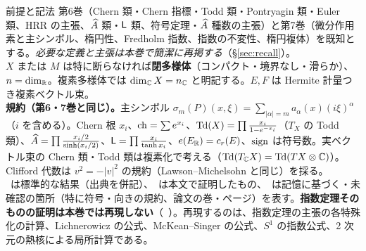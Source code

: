 \begin{goalbox}{前提と記法}
第6巻（Chern 類・Chern 指標・Todd 類・Pontryagin 類・Euler 類、HRR の主張、$\widehat{A}$ 類・$\mathsf{L}$ 類、符号定理・$\widehat{A}$ 種数の主張）と第7巻（微分作用素と主シンボル、楕円性、Fredholm 指数、指数の不変性、楕円複体）を既知とする。\emph{必要な定義と主張は本巻で簡潔に再掲する}（\S\ref{sec:recall}）。\\
$X$ または $M$ は特に断らなければ\textbf{閉多様体}（コンパクト・境界なし・滑らか）、$n=\dim_{\mathbb R}$。複素多様体では $\dim_{\mathbb C}X=n_{\mathbb C}$ と明記する。$E,F$ は Hermite 計量つき複素ベクトル束。\\
\textbf{規約（第6・7巻と同じ）。}主シンボル $\sigma_m(P)(x,\xi)=\sum_{|\alpha|=m}a_\alpha(x)(i\xi)^\alpha$（$i$ を含める）。Chern 根 $x_i$、$\mathrm{ch}=\sum e^{x_i}$、$\mathrm{Td}(X)=\prod\frac{x_i}{1-e^{-x_i}}$（$T_X$ の Todd 類）、$\widehat{A}=\prod\frac{x_i/2}{\sinh(x_i/2)}$、$\mathsf{L}=\prod\frac{x_i}{\tanh x_i}$、$e(E_{\mathbb R})=c_r(E)$、$\operatorname{sign}$ は符号数。実ベクトル束の Chern 類・Todd 類は複素化で考える（$\mathrm{Td}(T_{\mathbb C}X)=\mathrm{Td}(TX\otimes\mathbb C)$）。\\
Clifford 代数は $v^2=-|v|^2$ の規約（Lawson--Michelsohn と同じ）を採る。\\
\tC\ は標準的な結果（出典を併記）、\tP\ は本文で証明したもの、\tQ\ は記憶に基づく・未確認の箇所（特に符号・向きの規約、論文の巻・ページ）を表す。\textbf{指数定理そのものの証明は本巻では再現しない}（\tC\ ）。再現するのは、指数定理の主張の各特殊化の計算、Lichnerowicz の公式、McKean--Singer の公式、$S^1$ の指数公式、2 次元の熱核による局所計算である。
\end{goalbox}
\tableofcontents
\newpage
